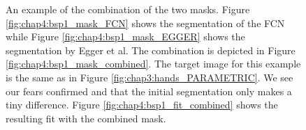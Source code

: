 \begin{figure}
\centering
{}
\caption{An example of the combination of the two masks. Figure \ref{fig:chap4:bsp1_mask_FCN} shows the segmentation of the FCN while Figure \ref{fig:chap4:bsp1_mask_EGGER} shows the segmentation by Egger et al. The combination is depicted in Figure \ref{fig:chap4:bsp1_mask_combined}. The target image for this example is the same as in Figure \ref{fig:chap3:hands_PARAMETRIC}. We see our fears confirmed and that the initial segmentation only makes a tiny difference. Figure \ref{fig:chap4:bsp1_fit_combined} shows the resulting fit with the combined mask.}
\label{fig:chap4:bsp1}
\end{figure}


